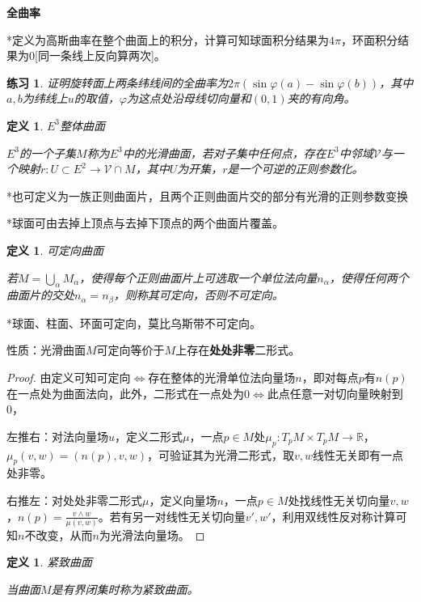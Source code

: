 \documentclass[a4paper,UTF8,fontset=windows]{ctexart}
\newtheorem{dfn}[thm]{定义}
\newtheorem*{hw}{练习}
\begin{document}
\textbf{全曲率}

*定义为高斯曲率在整个曲面上的积分，计算可知球面积分结果为$4\pi$，环面积分结果为0[同一条线上反向算两次]。

\begin{hw}
证明旋转面上两条纬线间的全曲率为$2\pi(\sin\varphi(a)-\sin\varphi(b))$，其中$a,b$为纬线上$u$的取值，$\varphi$为这点处沿母线切向量和$(0,1)$夹的有向角。
\end{hw}

\begin{dfn} $E^3$整体曲面

$E^3$的一个子集$M$称为$E^3$中的光滑曲面，若对子集中任何点，存在$E^3$中邻域$\mathcal{V}$与一个映射$r:U\subset E^2\to\mathcal{V}\cap M$，其中$U$为开集，$r$是一个可逆的正则参数化。
\end{dfn}

*也可定义为一族正则曲面片，且两个正则曲面片交的部分有光滑的正则参数变换

*球面可由去掉上顶点与去掉下顶点的两个曲面片覆盖。

\begin{dfn} 可定向曲面

若$M=\bigcup_\alpha M_\alpha$，使得每个正则曲面片上可选取一个单位法向量$n_\alpha$，使得任何两个曲面片的交处$n_\alpha=n_\beta$，则称其可定向，否则不可定向。
\end{dfn}

*球面、柱面、环面可定向，莫比乌斯带不可定向。

性质：光滑曲面$M$可定向等价于$M$上存在\textbf{处处非零}二形式。

\begin{proof}
由定义可知可定向$\Leftrightarrow$存在整体的光滑单位法向量场$n$，即对每点$p$有$n(p)$在一点处为曲面法向，此外，二形式在一点处为0$\Leftrightarrow$此点任意一对切向量映射到0，

左推右：对法向量场$u$，定义二形式$\mu$，一点$p\in M$处$\mu_p:T_pM\times T_pM\to\mathbb{R}$，$\mu_p(v,w)=(n(p),v,w)$，可验证其为光滑二形式，取$v,w$线性无关即有一点处非零。

右推左：对处处非零二形式$\mu$，定义向量场$n$，一点$p\in M$处找线性无关切向量$v,w$，$n(p)=\frac{v\wedge w}{\mu(v,w)}$。若有另一对线性无关切向量$v',w'$，利用双线性反对称计算可知$n$不改变，从而$n$为光滑法向量场。
\end{proof}

\begin{dfn} 紧致曲面

当曲面$M$是有界闭集时称为紧致曲面。
\end{dfn}
\end{document}
